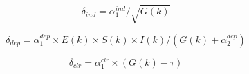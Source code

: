 {\begin{equation}\label{Eq:ind}
  \delta_{ind}=\alpha_1^{ind}/\sqrt{G(k)}
\end{equation}

\begin{equation}\label{Eq:dep}
  \delta_{dep}=\alpha_1^{dep} \times  E(k) \times S(k) \times I(k)/(G(k)+\alpha_2^{dep})
\end{equation}

\begin{equation}\label{Eq:clr}
  \delta_{clr}=\alpha_1^{clr} \times (G(k)-\tau)
\end{equation}
}

%
%
%
